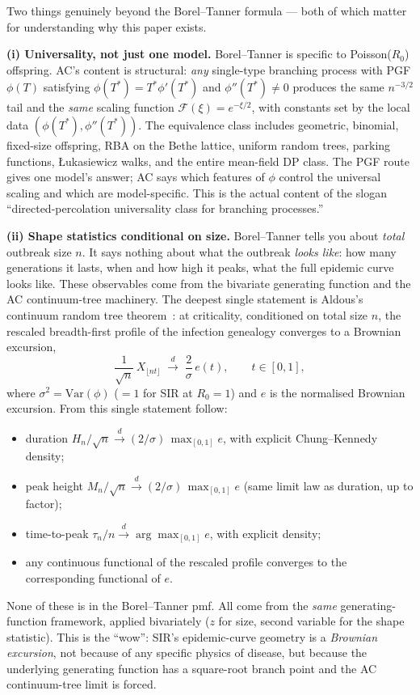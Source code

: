 \documentclass[11pt,a4paper]{article}
\theoremstyle{definition}
\begin{document}
Two things genuinely beyond the Borel--Tanner formula --- both of which
matter for understanding why this paper exists.

\textbf{(i) Universality, not just one model.}
Borel--Tanner is specific to Poisson($R_0$) offspring. AC's content is
structural: \emph{any} single-type branching process with PGF $\phi(T)$
satisfying $\phi(T^*) = T^* \phi'(T^*)$ and $\phi''(T^*)\neq 0$ produces
the same $n^{-3/2}$ tail and the \emph{same} scaling function
$\mathcal{F}(\xi)=e^{-\xi/2}$, with constants set by the local data
$(\phi(T^*), \phi''(T^*))$. The equivalence class includes geometric,
binomial, fixed-size offspring, RBA on the Bethe lattice, uniform
random trees, parking functions, \L{}ukasiewicz walks, and the entire
mean-field DP class. The PGF route gives one model's answer; AC says
which features of $\phi$ control the universal scaling and which are
model-specific. This is the actual content of the slogan
``directed-percolation universality class for branching processes.''

\textbf{(ii) Shape statistics conditional on size.}
Borel--Tanner tells you about \emph{total} outbreak size $n$. It says
nothing about what the outbreak \emph{looks like}: how many generations
it lasts, when and how high it peaks, what the full epidemic curve
looks like. These observables come from the bivariate generating
function and the AC continuum-tree machinery. The deepest single
statement is Aldous's continuum random tree theorem~\cite{aldous1993}:
at criticality, conditioned on total size $n$, the rescaled
breadth-first profile of the infection genealogy converges to a
Brownian excursion,
\begin{equation}
\frac{1}{\sqrt{n}}\, X_{\lfloor n t\rfloor}
\;\xrightarrow{d}\;
\frac{2}{\sigma}\, e(t),
\qquad t \in [0,1],
\label{eq:sir_excursion}
\end{equation}
where $\sigma^2 = \mathrm{Var}(\phi)$ ($=1$ for SIR at $R_0=1$) and
$e$ is the normalised Brownian excursion. From this single statement
follow:
\begin{itemize}[leftmargin=1.4em,itemsep=2pt]
\item duration $H_n / \sqrt{n} \xrightarrow{d}
      (2/\sigma)\,\max_{[0,1]} e$, with explicit Chung--Kennedy
      density;
\item peak height $M_n / \sqrt{n} \xrightarrow{d}
      (2/\sigma)\,\max_{[0,1]} e$ (same limit law as duration, up to
      factor);
\item time-to-peak $\tau_n / n \xrightarrow{d} \arg\max_{[0,1]} e$,
      with explicit density;
\item any continuous functional of the rescaled profile converges to
      the corresponding functional of $e$.
\end{itemize}
None of these is in the Borel--Tanner pmf. All come from the
\emph{same} generating-function framework, applied bivariately
($z$ for size, second variable for the shape statistic). This is the
``wow'': SIR's epidemic-curve geometry is a \emph{Brownian excursion},
not because of any specific physics of disease, but because the
underlying generating function has a square-root branch point and
the AC continuum-tree limit is forced.
\end{document}
